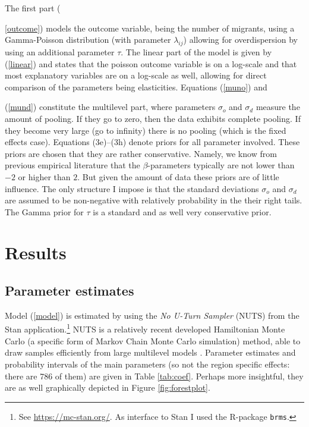 \documentclass[fleqn,10pt]{SelfArx} %
\begin{document}
		  The first part ({\ref{outcome}) models the outcome variable,
          being the number of migrants, using a Gamma-Poisson distribution
          (with parameter $\lambda_{ij}$) allowing for overdispersion
          by using an additional parameter $\tau$. The linear part of
          the model is given by (\ref{linear}) and states that the
          poisson outcome variable is on a log-scale and that most explanatory
          variables are on a log-scale as well, allowing for direct
          comparison of the parameters being elasticities. Equations
          (\ref{muno}) and {(\ref{mund}) constitute the multilevel
            part, where parameters $\sigma_o$ and $\sigma_d$ measure
            the amount of pooling. If they go to zero, then the
            data exhibits complete pooling. If they become very large
            (go to infinity) there is no pooling (which is the fixed
            effects case). Equations (3e)--(3h) denote priors for all parameter involved.
            These priors are chosen that they are rather conservative. Namely, we know from previous empirical literature
            that the $\beta$-parameters typically are not lower than $-2$ or higher than $2$. But given the amount of
            data these priors are of little influence. The only structure 
            I impose is that the standard deviations $\sigma_o$ and $\sigma_d$ are assumed to be non-negative with 
            relatively probability in the their right tails. The Gamma prior for $\tau$ is a standard and as well very conservative prior.
                      
        \section{Results}

        \subsection{Parameter estimates}
        
        Model (\ref{model}) is estimated by using the \emph{No U-Turn
          Sampler} (NUTS) from the Stan application.\footnote{See \href{https://mc-stan.org/}{https://mc-stan.org/}. As interface to Stan
          \citep[see for an overview article of
          Stan][]{carpenter2017stan} I used the R-package \citep{brms} \texttt{brms}.} NUTS is a relatively recent developed Hamiltonian Monte Carlo (a specific form of Markov
        Chain Monte Carlo simulation) method, able to draw samples
        efficiently from large multilevel models
        \citep{hoffman2014no}. Parameter estimates and probability
        intervals of the main parameters (so not the region specific
        effects: there are 786 of them) are given in Table
        \ref{tab:coef}. Perhaps more insightful, they are as well graphically
        depicted in Figure \ref{fig:forestplot}.

}}
\end{document}
